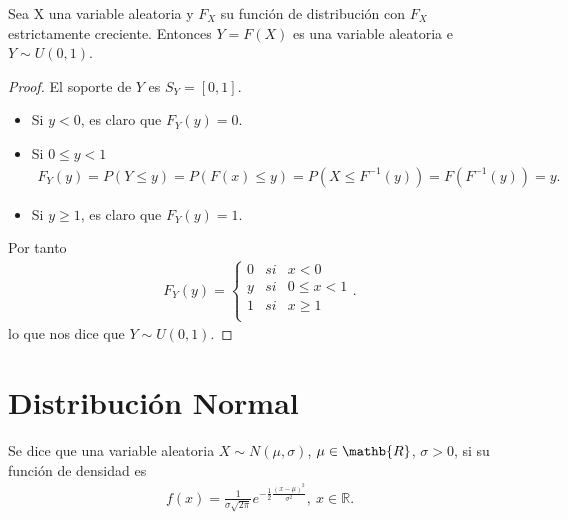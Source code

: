 \begin{prop}
Sea X una variable aleatoria y $F_X$ su función de distribución con $F_X$ estrictamente creciente. Entonces $Y = F(X)$ es una variable aleatoria e $Y \sim U(0,1)$.
\end{prop}

\begin{proof}
El soporte de $Y$ es $S_Y = [0,1]$.
\begin{itemize}
    \item Si $y < 0$, es claro que $F_Y(y) = 0$.
    \item Si $0 \leq y < 1$
    \begin{align*}
        F_Y(y) = P(Y \leq y) = P(F(x) \leq y) = P(X \leq F^{-1}(y)) = F(F^{-1}(y)) = y.
    \end{align*}
    \item Si $y \ge 1$, es claro que $F_Y(y) = 1$.
\end{itemize}
Por tanto
\begin{align*}
    F_Y(y) = \left\{ \begin{array}{lcc}
             0 &  si  & x < 0\\
             y &  si  & 0 \leq x < 1\\
             1 &  si  & x \ge 1\\
             \end{array}
        \right. .
\end{align*}
lo que nos dice que $Y \sim U(0,1)$.
\end{proof}

\section{Distribución Normal}

\begin{defi}
Se dice que una variable aleatoria $X \sim N(\mu, \sigma)$, $\mu \in \mathb{R}$, $\sigma > 0$, si su función de densidad es
\begin{align*}
    f(x) = \frac{1}{\sigma \sqrt{2\pi}}e^{-\frac{1}{2}\frac{(x - \mu)^2}{\sigma^2}}, \ x \in \mathbb{R}.
\end{align*}
\end{defi}

